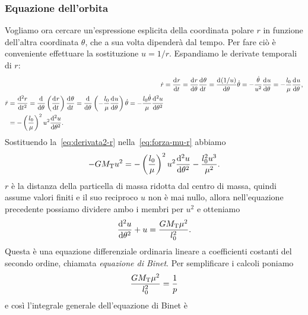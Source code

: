 \subsubsection{Equazione dell'orbita}
\label{sec:equazione-dellorbita}

Vogliamo ora cercare un'espressione esplicita della coordinata polare $r$ in
funzione dell'altra coordinata $\theta$, che a sua volta dipenderà dal
tempo. Per fare ciò è conveniente effettuare la sostituzione $u=1/r$. Espandiamo
le derivate temporali di $r$:
\begin{subequations}
  \begin{align}
    \dot{r} &= \toder{r}{t} = \toder{r}{\theta}\toder{\theta}{t} =
    \toder{(1/u)}{\theta}\dot{\theta} =
    -\frac{\dot{\theta}}{u^2}\toder{u}{\theta}
    = -\frac{l_0}{\mu}\toder{u}{\theta}, \label{eq:derivata1-r}\\
    \begin{split}
      \ddot{r} &= \toder[2]{r}{t} = \toder{}{\theta} \left( \toder{r}{t}
      \right)\toder{\theta}{t} = \toder{}{\theta} \left(
        -\frac{l_0}{\mu}\toder{u}{\theta} \right)\dot{\theta} =
      -\frac{l_0\dot{\theta}}{\mu}\toder[2]{u}{\theta} \\
      &= - \left(
        \frac{l_0}{\mu} \right)^2u^2\toder[2]{u}{\theta}. \label{eq:derivata2-r}
    \end{split}
  \end{align}
\end{subequations}
Sostituendo la~\eqref{eq:derivata2-r} nella~\eqref{eq:forza-mu-r} abbiamo
\begin{equation}
  -GM_\textup{T}u^2 = -\left(
        \frac{l_0}{\mu} \right)^2u^2\toder[2]{u}{\theta} - \frac{l_0^2u^3}{\mu^2}.
\end{equation}
$r$ è la distanza della particella di massa ridotta dal centro di massa, quindi
assume valori finiti e il suo reciproco $u$ non è mai nullo, allora
nell'equazione precedente possiamo dividere ambo i membri per $u^2$ e otteniamo
\begin{equation}
  \toder[2]{u}{\theta} + u = \frac{GM_\textup{T}\mu^2}{l_0^2}.
\end{equation}
Questa è una equazione differenziale ordinaria lineare a coefficienti costanti
del secondo ordine, chiamata \emph{equazione di Binet}. Per semplificare i
calcoli poniamo
\begin{equation}
  \label{eq:rec-semilato}
  \frac{GM_\textup{T}\mu^2}{l_0^2} = \frac{1}{p}
\end{equation}
e così l'integrale generale dell'equazione di Binet è
